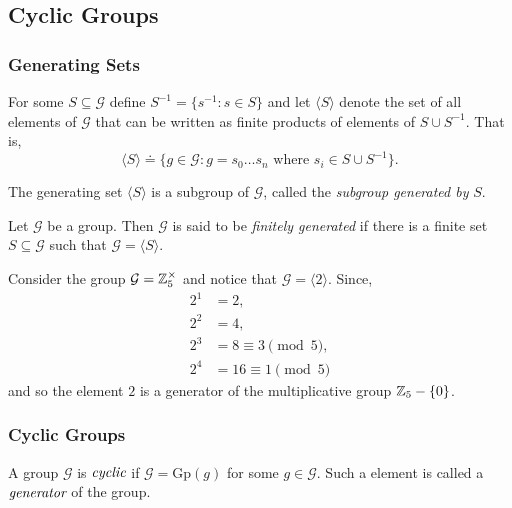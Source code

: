 
\subsection{Cyclic Groups}
\label{sec:cyclicgroups}

\subsubsection{Generating Sets}

\begin{defn}
	For some $S \subseteq \mathcal{G}$ define $S^{-1} = \{ s^{-1} : s \in S \}$
	and let $\langle S \rangle$ denote the set of all elements of
	$\mathcal{G}$ that can be written as finite products of elements of
	$S \cup S^{-1}$. That is,
	\[
		\langle S \rangle
		\doteq \{ g \in \mathcal{G} : g = s_0 \dots s_n \text{ where }
		s_i \in S \cup S^{-1} \}.
	\]
\end{defn}

\begin{lem}
	The generating set $\langle S \rangle$ is a subgroup of $\mathcal{G}$,
	called the \emph{subgroup generated by} $S$.
\end{lem}

\begin{defn}
	Let $\mathcal{G}$ be a group. Then $\mathcal{G}$ is said to be
	\emph{finitely generated} if there is a finite set $S \subseteq \mathcal{G}$
	such that $\mathcal{G} = \langle S \rangle$.
\end{defn}

\begin{exmp}
	Consider the group $\mathcal{G} = \mathbb{Z}_{5}^{\times}$ and notice that
	$\mathcal{G} = \langle 2 \rangle$. Since,
	\begin{align*}
		2^1 &= 2, \\
		2^2 &= 4, \\
		2^3 &= 8 \equiv 3 \pmod 5 , \\
		2^4 &= 16 \equiv 1 \pmod 5
	\end{align*}
	and so the element $2$ is a generator of the multiplicative group
	$\mathbb{Z}_{5} - \{0\}$.
\end{exmp}

\subsubsection{Cyclic Groups}

\begin{defn}
	A group $\mathcal{G}$ is $\emph{cyclic}$ if $\mathcal{G}=\mbox{Gp}(g)$ for some $g \in \mathcal{G}$.
	Such a element is called a $\emph{generator}$ of the group.
\end{defn}

